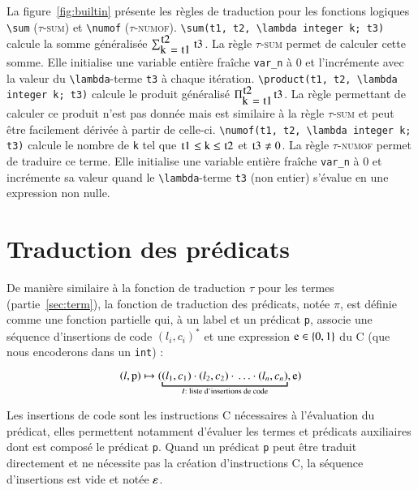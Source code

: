 La figure~\ref{fig:builtin} présente les règles de traduction pour les fonctions
logiques \lstinline|\sum| (\textsc{$\tau$-sum}) et \lstinline|\numof|
(\textsc{$\tau$-numof}).
\lstinline'\sum(t1, t2, \lambda integer k; t3)' calcule la somme généralisée
$\sum_{\mbox{\lstinline'k = t1'}}^{\mbox{\lstinline't2'}}\mbox{\lstinline't3'}$.
La règle \textsc{$\tau$-sum} permet de calculer cette somme.
Elle initialise une variable entière fraîche \lstinline|var_n| à $0$ et
l'incrémente avec la valeur du \lstinline|\lambda|-terme \lstinline't3' à chaque
itération.
\lstinline'\product(t1, t2, \lambda integer k; t3)' calcule le produit
généralisé $\Pi_{\mbox{\lstinline'k = t1'}}^{\mbox{\lstinline't2'}}\mbox{\lstinline't3'}$.
La règle permettant de calculer ce produit n'est pas donnée mais est similaire à
la règle \textsc{$\tau$-sum} et peut être facilement dérivée à partir de
celle-ci.
\lstinline'\numof(t1, t2, \lambda integer k; t3)' calcule le nombre de
\lstinline'k' tel que
$\mbox{\lstinline't1'} \le \mbox{\lstinline'k'} \le \mbox{\lstinline't2'}$ et
$\mbox{\lstinline't3'} \neq 0$.
La règle \textsc{$\tau$-numof} permet de traduire ce terme.
Elle initialise une variable entière fraîche \lstinline|var_n| à $0$ et
incrémente sa valeur quand le \lstinline|\lambda|-terme \lstinline't3' (non
entier) s'évalue en une expression non nulle.


\section{Traduction des prédicats \eacsl}
\label{sec:pred}


De manière similaire à la fonction de traduction $\tau$ pour les termes
(partie~\ref{sec:term}), la fonction de traduction des prédicats, notée $\pi$,
est définie comme une fonction partielle qui, à un label et un prédicat \eacsl
\lstinline'p', associe une séquence d'insertions de code $(l_i, c_i)^*$ et une
expression $\mbox{\lstinline'e'} \in \{0, 1\}$  du C (que nous encoderons dans
un \lstinline'int') :

\[
(l, \mbox{\lstinline'p'}) \rulearrow
(\underbracket{(l_1, c_1) \concat (l_2, c_2) \concat \ldots
  \concat (l_n, c_n)}_{I : \text{ liste d'insertions de code}}, \mbox{\lstinline'e'})
\]

Les insertions de code sont les instructions C nécessaires à l'évaluation du
prédicat, elles permettent notamment d'évaluer les termes et prédicats
auxiliaires dont est composé le prédicat \lstinline'p'.
Quand un prédicat \lstinline'p' peut être traduit directement et ne nécessite
pas la création d'instructions C, la séquence d'insertions est vide et notée
$\varepsilon$.

